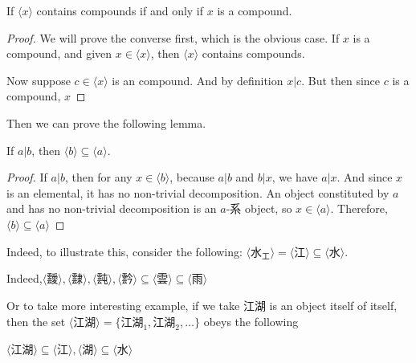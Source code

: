 \begin{theorem}\label{thm:the-emergence-set-of-a-set-is-a-subset-of-the-set}
    If $\langle x \rangle$ contains compounds if and only if $x$ is a compound. 
\end{theorem}
\begin{proof}
    We will prove the converse first, which is the obvious case. If $x$ is a compound, and given $x\in \langle x \rangle$, then $\langle x \rangle$ contains compounds. 

    Now suppose $c\in \langle x \rangle$ is an compound. And by definition $x|c$. But then since $c$ is a compound, $x$ 


\end{proof}


Then we can prove the following lemma. 
\begin{lemma}\label{lem:emergence-of-a-constituted-is-emergence-of-the-constituent}
    If $a|b$, then $ \langle b \rangle \subseteq \langle a \rangle$.
\end{lemma}
\begin{proof}
    If $a|b$, then for any $x\in \langle b \rangle$, because $a|b$ and $b|x$, we have $a|x$. And since $x$ is an elemental, it has no non-trivial decomposition. An object constituted by $a$ and has no non-trivial decomposition is an $a$-系 object, so $x \in \langle a \rangle$. Therefore, $\langle b \rangle \subseteq \langle a \rangle$
\end{proof}

Indeed, to illustrate this, consider the following:
$\langle \text{水}_\text{工} \rangle = \langle \text{江} \rangle \subseteq
\langle \text{水} \rangle$. 

Indeed,$\langle \text{靉} \rangle, \langle \text{霴} \rangle, \langle \text{霕} \rangle, \langle \text{霒} \rangle \subseteq \langle \text{雲} \rangle \subseteq \langle \text{雨} \rangle$

Or to take more interesting example, if we take $\text{江湖}$ is an object itself of itself, then the set $\langle \text{江湖} \rangle = \{\text{江湖}_{1}, \text{江湖}_{2}, \ldots\}$ obeys the following 

$\langle \text{江湖} \rangle \subseteq \langle \text{江} \rangle,  \langle \text{湖} \rangle \subseteq \langle \text{水} \rangle$

